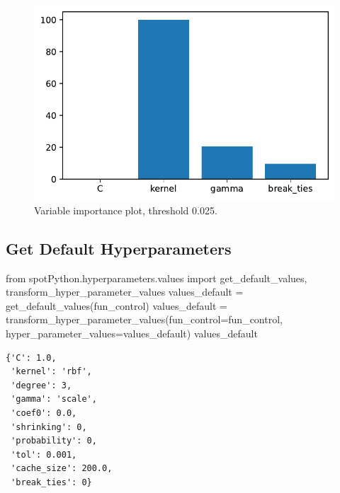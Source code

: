 \documentclass[
  letterpaper,
  DIV=11,
  numbers=noendperiod]{scrreprt}
\newenvironment{Shaded}{\begin{snugshade}}{\end{snugshade}}
\newcommand{\ImportTok}[1]{\textcolor[rgb]{0.00,0.46,0.62}{#1}}
\newcommand{\NormalTok}[1]{\textcolor[rgb]{0.00,0.23,0.31}{#1}}
\newcommand{\OperatorTok}[1]{\textcolor[rgb]{0.37,0.37,0.37}{#1}}
\begin{document}
\begin{figure}[H]

{\centering \includegraphics{10_spot_hpt_sklearn_classification_files/figure-pdf/cell-24-output-1.pdf}

}

\caption{Variable importance plot, threshold 0.025.}

\end{figure}

\hypertarget{get-default-hyperparameters}{%
\subsection{Get Default
Hyperparameters}\label{get-default-hyperparameters}}

\begin{Shaded}
\begin{Highlighting}[]
\ImportTok{from}\NormalTok{ spotPython.hyperparameters.values }\ImportTok{import}\NormalTok{ get\_default\_values, transform\_hyper\_parameter\_values}
\NormalTok{values\_default }\OperatorTok{=}\NormalTok{ get\_default\_values(fun\_control)}
\NormalTok{values\_default }\OperatorTok{=}\NormalTok{ transform\_hyper\_parameter\_values(fun\_control}\OperatorTok{=}\NormalTok{fun\_control, hyper\_parameter\_values}\OperatorTok{=}\NormalTok{values\_default)}
\NormalTok{values\_default}
\end{Highlighting}
\end{Shaded}

\begin{verbatim}
{'C': 1.0,
 'kernel': 'rbf',
 'degree': 3,
 'gamma': 'scale',
 'coef0': 0.0,
 'shrinking': 0,
 'probability': 0,
 'tol': 0.001,
 'cache_size': 200.0,
 'break_ties': 0}
\end{verbatim}
\end{document}
